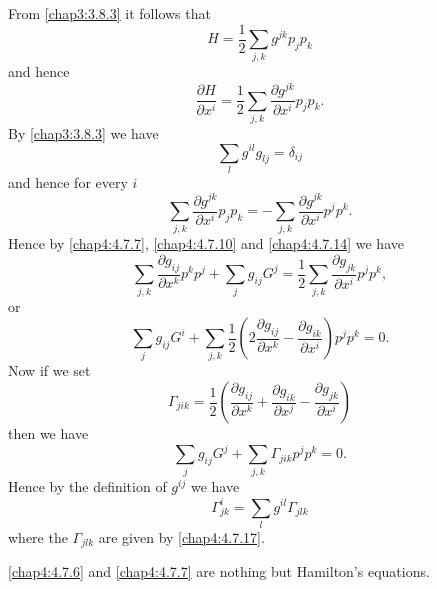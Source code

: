 From \eqref{chap3:3.8.3} it follows that
\begin{equation*}
H=\frac{1}{2}\sum_{j,k} g^{jk}p_{j}p_{k}\tag{4.7.12}\label{chap4:4.7.12}
\end{equation*}
and hence
\begin{equation*}
\frac{\partial H}{\partial x^{i}}=\frac{1}{2}\sum_{j,k}\frac{\partial
  g^{jk}}{\partial x^{i}}p_{j}p_{k}.\tag{4.7.13}\label{chap4:4.7.13}
\end{equation*}
By \eqref{chap3:3.8.3} we have
$$
\sum_{l}g^{il}g_{lj}=\delta_{ij}
$$
and hence for every $i$
\begin{equation*}
\sum_{j,k}\frac{\partial g^{jk}}{\partial
  x^{i}}p_{j}p_{k}=-\sum_{j,k}\frac{\partial g^{jk}}{\partial
  x^{i}}p^{j}p^{k}.\tag{4.7.14}\label{chap4:4.7.14} 
\end{equation*}
Hence by \eqref{chap4:4.7.7}, \eqref{chap4:4.7.10} and \eqref{chap4:4.7.14} we have
\begin{equation*}
\sum_{j,k}\frac{\partial g_{ij}}{\partial
  x^{k}}p^{k}p^{j}+\sum_{j}g_{ij}G^{j}=\frac{1}{2}\sum_{j,k}\frac{\partial
  g_{jk}}{\partial x^{i}}p^{j}p^{k},\tag{4.7.15}\label{chap4:4.7.15}
\end{equation*}
or
\begin{equation*}
\sum_{j}g_{ij}G^{i}+\sum_{j,k}\frac{1}{2}\left(2\frac{\partial
  g_{ij}}{\partial x^{k}}-\frac{\partial g_{ik}}{\partial
  x^{i}}\right)p^{j}p^{k}=0.\tag{4.7.16}\label{chap4:4.7.16} 
\end{equation*} 
Now \pageoriginale if we set
\begin{equation*}
\Gamma_{jik}=\frac{1}{2}\left(\frac{\partial g_{ij}}{\partial
  x^{k}}+\frac{\partial g_{ik}}{\partial x^{j}}-\frac{\partial
  g_{jk}}{\partial x^{i}}\right)\tag{4.7.17}\label{chap4:4.7.17}
\end{equation*}
then we have
\begin{equation*}
\sum_{j}g_{ij}G^{j}+\sum_{j,k}\Gamma_{jik}p^{j}p^{k}=0.\tag{4.7.18}\label{chap4:4.7.18}
\end{equation*}
Hence by the definition of $g^{ij}$ we have
\begin{equation*}
\Gamma^{i}_{jk}=\sum_{l}g^{il}\Gamma_{jlk}\tag{4.7.19}\label{chap4:4.7.19}
\end{equation*}
where the $\Gamma_{jlk}$ are given by \eqref{chap4:4.7.17}.

\begin{remark*}
\eqref{chap4:4.7.6} and \eqref{chap4:4.7.7} are nothing but Hamilton's
equations. 
\end{remark*}

